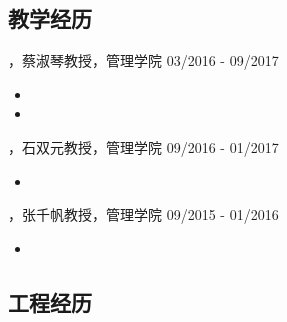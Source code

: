 \subsection{教学经历}

\begin{xframe}{}
    \cvexperience
    {，蔡淑琴教授，管理学院}
    {03/2016 - 09/2017}

    \vspace{-2.5mm}

    \begin{itemize}
        \item {}
        \item {}
    \end{itemize}

    \vspace{1.0mm}
    \cvexperience
    {，石双元教授，管理学院}
    {09/2016 - 01/2017}

    \vspace{-2.5mm}

    \begin{itemize}
        \item {}
    \end{itemize}

    \vspace{1.0mm}
    \cvexperience
    {，张千帆教授，管理学院}
    {09/2015 - 01/2016}

    \vspace{-2.5mm}

    \begin{itemize}
        \item {}
    \end{itemize}
\end{xframe}

\subsection{工程经历}


